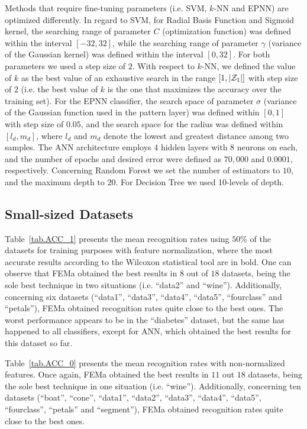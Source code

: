 Methods that require fine-tuning parameters (i.e. SVM, $k$-NN and EPNN) are optimized differently. In regard to SVM, for Radial Basis Function and Sigmoid kernel, the searching range of parameter $C$ (optimization function) was defined within the interval $[-32, 32]$, while the searching range of parameter $\gamma$ (variance of the Gaussian kernel) was defined within the interval $[0, 32]$. For both parameters we used a step size of $2$. With respect to $k$-NN, we defined the value of $k$ as the best value of an exhaustive search in the range $[1,|{\cal{Z}}_{1}|]$ with step size of $2$ (i.e. the best value of $k$ is the one that maximizes the accuracy over the training set). For the EPNN classifier, the search space of parameter $\sigma$ (variance of the Gaussian function used in the pattern layer) was defined within $[0,1]$ with step size of $0.05$, and the search space for the radius was defined within $[l_d,m_d]$, where $l_d$ and $m_d$ denote the lowest and greatest distance among two samples. The ANN architecture employs $4$ hidden layers with $8$ neurons on each, and the number of epochs and desired error were defined as $70,000$ and $0.0001$, respectively. Concerning Random Forest we set the number of estimators to $10$, and the maximum depth to $20$. For Decision Tree we used 10-levels of depth.

\subsection{Small-sized Datasets}
\label{ss.small}

Table~\ref{tab.ACC_1} presents the mean recognition rates using $50\%$ of the datasets for training purposes with feature normalization, where the most accurate results according to the Wilcoxon statistical tool are in bold. One can observe that FEMa obtained the best results in $8$ out of $18$ datasets, being the sole best technique in two situations (i.e. ``data2'' and ``wine''). Additionally, concerning six datasets (``data1'',  ``data3'', ``data4'', ``data5'', ``fourclass'' and ``petals''), FEMa obtained recognition rates quite close to the best ones. The worst performance appears to be in the ``diabetes'' dataset, but the same has happened to all classifiers, except for ANN, which obtained the best results for this dataset so far.




Table~\ref{tab.ACC_0} presents the mean recognition rates with non-normalized features. Once again, FEMa obtained the best results in $11$ out $18$ datasets, being the sole best technique in one situation (i.e. ``wine''). Additionally, concerning ten datasets (``boat'', ``cone'', ``data1'', ``data2'',  ``data3'', ``data4'', ``data5'', ``fourclass'', ``petals'' and ``segment''), FEMa obtained recognition rates quite close to the best ones.

